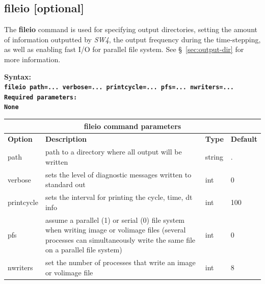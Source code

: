 \documentclass[11pt]{report}
\begin{document}
\subsection{fileio [optional]}
The {\bf fileio} command is used for specifying output directories, setting the amount of
information outputted by \emph{SW4}, the output frequency during the time-stepping, as well
as enabling fast I/O for parallel file system. See \S~\ref{sec:output-dir} for more information.
\begin{flushleft}\bf
Syntax:\\ \tt fileio path=... verbose=... printcycle=... pfs=... nwriters=... \\ 
\bf Required parameters:\\ 
\rm None
\end{flushleft}
\begin{center}
\begin{tabular}{|l|p{8cm}|l|l|} \hline
\multicolumn{4}{|c|}{\bf fileio command parameters}\\ \hline
\bf{Option} & \bf{Description} & \bf{Type} & \bf{Default} \\ \hline \hline
path        & path to a directory where all output will be written & string & . \\ \hline
verbose	    & sets the level of diagnostic messages written to standard out & int & 0  \\ \hline
printcycle  & sets the interval for printing the cycle, time, dt info & int & 100 \\ \hline
pfs         & assume a parallel (1) or serial (0) file system when writing image or volimage files (several
processes can simultaneously write the same file on a parallel file
system) & int & 0 \\ \hline
nwriters    & set the number of processes that write an image or volimage file & int & 8 \\ \hline
\end{tabular}
\end{center}

\end{document}
